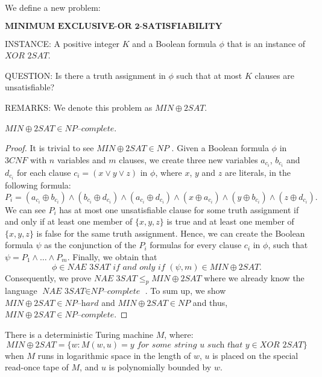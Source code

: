 \documentclass[a4paper,UKenglish,cleveref, autoref]{lipics-v2019}
\begin{document}
We define a new problem:

\begin{definition}
$\textbf{MINIMUM EXCLUSIVE-OR 2-SATISFIABILITY}$

INSTANCE: A positive integer $K$ and a Boolean formula $\phi$ that is an instance of $\textit{XOR 2SAT}$.

QUESTION: Is there a truth assignment in $\phi$ such that at most $K$ clauses are unsatisfiable?

REMARKS: We denote this problem as $MIN\oplus2SAT$.
\end{definition}


\begin{theorem}
\label{completeness}
$MIN\oplus2SAT \in \textit{NP--complete}$.
\end{theorem}

\begin{proof}
It is trivial to see $MIN\oplus2SAT \in NP$ \cite{Pap03}. Given a Boolean formula $\phi$ in $3CNF$ with $n$ variables and $m$ clauses, we create three new variables $a_{c_{i}}$, $b_{c_{i}}$ and $d_{c_{i}}$ for each clause $c_{i} = (x \vee y \vee z)$ in $\phi$, where $x$, $y$ and $z$ are literals, in the following formula:
\[P_{i} = (a_{c_{i}} \oplus b_{c_{i}}) \wedge (b_{c_{i}} \oplus d_{c_{i}}) \wedge (a_{c_{i}} \oplus d_{c_{i}}) \wedge (x \oplus a_{c_{i}}) \wedge (y \oplus b_{c_{i}}) \wedge (z \oplus d_{c_{i}}).\]
We can see $P_{i}$ has at most one unsatisfiable clause for some truth assignment if and only if at least one member of $\{x,y,z\}$ is true and at least one member of $\{x,y,z\}$ is false for the same truth assignment. Hence, we can create the Boolean formula $\psi$ as the conjunction of the $P_{i}$ formulas for every clause $c_{i}$ in $\phi$, such that $\psi = P_{1} \wedge \ldots \wedge P_{m}$. Finally, we obtain that
\[\phi \in \textit{NAE 3SAT} \textit{ if and only if } (\psi, m) \in MIN\oplus2SAT.\]
Consequently, we prove $\textit{NAE 3SAT} \leq_{p} MIN\oplus2SAT$ where we already know the language $\textit{NAE 3SAT} \in \textit{NP--complete}$ \cite{GJ79}. To sum up, we show $MIN\oplus2SAT \in \textit{NP--hard}$ and $MIN\oplus2SAT \in NP$ and thus, $MIN\oplus2SAT \in \textit{NP--complete}$.
\end{proof}

\begin{theorem}
\label{proof}
There is a deterministic Turing machine $M$, where:
\[MIN\oplus2SAT = \{w: M(w, u) = y \textit{ for some string } u \textit{ such that } y \in \textit{XOR 2SAT}\}\]
when $M$ runs in logarithmic space in the length of $w$, $u$ is placed on the special read-once tape of $M$, and $u$ is polynomially bounded by $w$.
\end{theorem}
\end{document}
